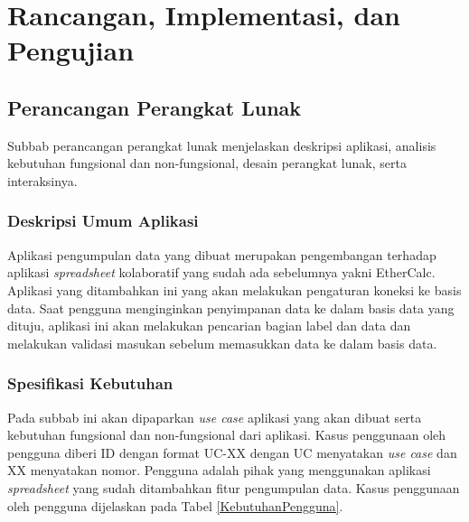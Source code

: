 \chapter{Rancangan, Implementasi, dan Pengujian}

\section{Perancangan Perangkat Lunak} \label{PerancanganPL}
Subbab perancangan perangkat lunak menjelaskan deskripsi aplikasi, analisis kebutuhan fungsional dan non-fungsional, desain perangkat lunak, serta interaksinya.

	\subsection{Deskripsi Umum Aplikasi}
	Aplikasi pengumpulan data yang dibuat merupakan pengembangan terhadap aplikasi \textit{spreadsheet} kolaboratif yang sudah ada sebelumnya yakni EtherCalc. Aplikasi yang ditambahkan ini yang akan melakukan pengaturan koneksi ke basis data. Saat pengguna menginginkan penyimpanan data ke dalam basis data yang dituju, aplikasi ini akan melakukan pencarian bagian label dan data dan melakukan validasi masukan sebelum memasukkan data ke dalam basis data. 

	\subsection{Spesifikasi Kebutuhan}
	Pada subbab ini akan dipaparkan \textit{use case} aplikasi yang akan dibuat serta kebutuhan fungsional dan non-fungsional dari aplikasi. Kasus penggunaan oleh pengguna diberi ID dengan format UC-XX dengan UC menyatakan \textit{use case} dan XX menyatakan nomor. Pengguna adalah pihak yang menggunakan aplikasi \textit{spreadsheet} yang sudah ditambahkan fitur pengumpulan data. Kasus penggunaan oleh pengguna dijelaskan pada Tabel \ref{KebutuhanPengguna}.

